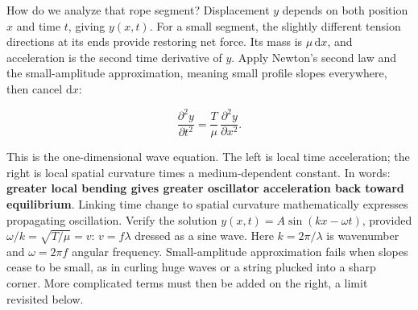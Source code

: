 \begin{mathbridge}
How do we analyze that rope segment? Displacement \(y\) depends on both position \(x\) and time \(t\), giving \(y(x,t)\). For a small segment, the slightly different tension directions at its ends provide restoring net force. Its mass is \(\mu\,\mathrm{d}x\), and acceleration is the second time derivative of \(y\). Apply Newton's second law and the small-amplitude approximation, meaning small profile slopes everywhere, then cancel \(\mathrm{d}x\):

\[
  \frac{\partial^2 y}{\partial t^2} = \frac{T}{\mu}\,\frac{\partial^2 y}{\partial x^2}.
\]

This is the one-dimensional wave equation. The left is local time acceleration; the right is local spatial curvature times a medium-dependent constant. In words: \textbf{greater local bending gives greater oscillator acceleration back toward equilibrium}. Linking time change to spatial curvature mathematically expresses propagating oscillation. Verify the solution \(y(x,t)=A\sin(kx-\omega t)\), provided \(\omega/k=\sqrt{T/\mu}=v\): \(v=f\lambda\) dressed as a sine wave. Here \(k=2\pi/\lambda\) is wavenumber and \(\omega=2\pi f\) angular frequency. Small-amplitude approximation fails when slopes cease to be small, as in curling huge waves or a string plucked into a sharp corner. More complicated terms must then be added on the right, a limit revisited below.
\end{mathbridge}

